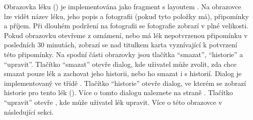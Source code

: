 \documentclass[../TakeYourPill.tex]{subfiles}
\begin{document}
Obrazovka léku () je implementována jako fragment s layoutem . Na obrazovce lze vidět název léku, jeho popis a fotografii (pokud tyto položky má), připomínky a příjem. Při dlouhém podržení na fotografii se fotografie zobrazí v plné velikosti. Pokud obrazovku otevřeme z oznámení, nebo má lék nepotvrzenou připomínku v posledních 30 minutách, zobrazí se nad titulkem karta vyznívající k potvrzení této připomínky. Na spodní části obrazovky jsou tlačítka \enquote{smazat}, \enquote{historie} a \enquote{upravit}. Tlačítko \enquote{smazat} otevře dialog, kde uživatel může zvolit, zda chce smazat pouze lék a zachovat jeho historii, nebo ho smazat i s historií. Dialog je implementovaný ve třídě . Tlačítko \enquote{historie} otevře dialog, ve kterém se zobrazí historie pro tento lék (). Více o tomto dialogu naleznete na straně \pageref{sec:historydialog}. Tlačítko \enquote{upravit} otevře , kde může uživatel lék upravit. Více o této obrazovce v následující sekci.
\end{document}
